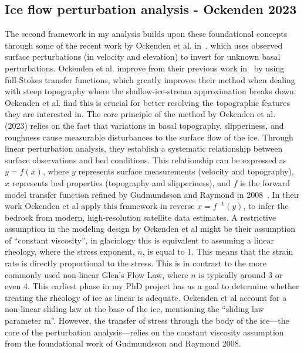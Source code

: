 \subsection{Ice flow perturbation analysis - Ockenden 2023}
The second framework in my analysis builds upon these foundational concepts through some of the recent work by Ockenden et al. in~\cite{Ockenden_2023}, which uses observed surface perturbations (in velocity and elevation) to invert for unknown basal perturbations. Ockenden et al. improve from their previous work in~\cite{Ockenden_2022} by using full-Stokes transfer functions, which greatly improves their method when dealing with steep topography where the shallow-ice-stream approximation breaks down. Ockenden et al. find this is crucial for better resolving the topographic features they are interested in. The core principle of the method by Ockenden et al. (2023) relies on the fact that variations in basal topography, slipperiness, and roughness cause measurable disturbances to the surface flow of the ice. Through linear perturbation analysis, they establish a systematic relationship between surface observations and bed conditions. This relationship can be expressed as $y=f(x)$, where $y$ represents surface measurements (velocity and topography), $x$ represents bed properties (topography and slipperiness), and $f$ is the forward model transfer function refined by Gudmundsson and Raymond in 2008~\cite{Gudmundsson_2008}. 
In their work Ockenden et al apply this framework in reverse $x=f^{-1}(y)$, to infer the bedrock from modern, high-resolution satellite data estimates. A restrictive assumption in the modeling design by Ockenden et al might be their assumption of ``constant viscosity'', in glaciology this is equivalent to assuming a linear rheology, where the stress exponent, $n$, is equal to 1. This means that the strain rate is directly proportional to the stress. This is in contrast to the more commonly used non-linear Glen's Flow Law, where $n$ is typically around 3 or even 4. This earliest phase in my PhD project has as a goal to determine whether treating the rheology of ice as  linear is adequate. Ockenden et al account for a non-linear sliding law at the base of the ice, mentioning the ``sliding law parameter m''. However, the transfer of stress through the body of the ice—the core of the perturbation analysis—relies on the constant viscosity assumption from the foundational work of Gudmundsson and Raymond 2008.


